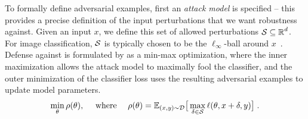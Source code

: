 

To formally define adversarial examples, first an \emph{attack model} is specified -- this provides a precise definition of the input perturbations that we want robustness against.
Given an input $x$, we define this set of allowed perturbations $\mathcal{S} \subseteq \operatorname{\mathbb{R}}^d$.
For image classification, 
$\mathcal{S}$ is typically chosen to be the $\ell_\infty$-ball around $x$~\citep{goodfellow2014explaining}. 
Defense against is formulated by \citet{madry2018towards} as a min-max optimization, where the inner maximization allows the attack model to maximally fool the classifier, and the outer minimization of the classifier loss uses the resulting adversarial examples to update model parameters.
\begin{equation}
\label{eq:minmax}
	\min_\theta \rho(\theta),\quad \text{ where }\quad \rho(\theta) =
    \mathbb{E}_{(x,y)\sim\mathcal{D}}\big[\max_{\delta\in 
    \mathcal{S}}
    \ell(\theta,x+\delta,y)\big] \; .
\end{equation}

